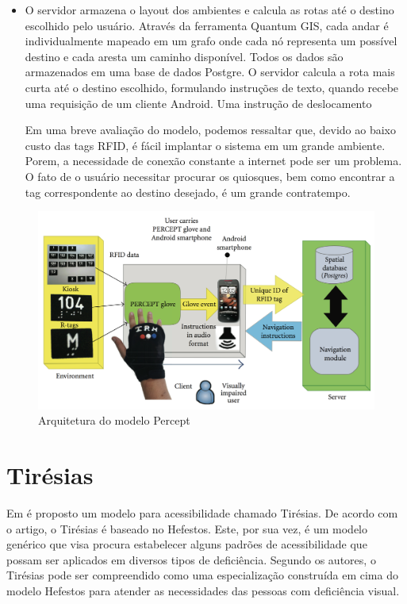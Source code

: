 \documentclass[english,brazilian]{UNISINOSmonografia}
\begin{document}
\begin{itemize}
	\item O servidor armazena o layout dos ambientes e calcula as rotas até o destino escolhido pelo usuário. Através da ferramenta Quantum GIS, cada andar é individualmente mapeado em um grafo onde cada nó representa um possível destino e cada aresta um caminho disponível. Todos os dados são armazenados em uma base de dados Postgre. O servidor calcula a rota mais curta até o destino escolhido, formulando instruções de texto, quando recebe uma requisição de um cliente Android. Uma instrução de deslocamento 

	Em uma breve avaliação do modelo, podemos ressaltar que, devido ao baixo custo das tags RFID, é fácil implantar o sistema em um grande ambiente. Porem, a necessidade de conexão constante a internet pode ser um problema. O fato de o usuário necessitar procurar os quiosques, bem como encontrar a tag correspondente ao destino desejado, é um grande contratempo.
\end{itemize}

	\FloatBarrier
	\begin{figure}[!ht]
		\caption{Arquitetura do modelo Percept}
		\label{fig:visaoGeral}
		\centering%
		\begin{minipage}{.9\textwidth}
			\includegraphics[width=\textwidth]{imgs/perceptArquitetura}
		\end{minipage}
	\end{figure}
	\FloatBarrier

	\section{Tirésias}
Em  é proposto um modelo para acessibilidade chamado Tirésias. De acordo com o artigo, o Tirésias é baseado no Hefestos. Este, por sua vez, é um modelo genérico que visa procura estabelecer alguns padrões de acessibilidade que possam ser aplicados em diversos tipos de deficiência. Segundo os autores, o Tirésias pode ser compreendido como uma especialização construída em cima do modelo Hefestos para atender as necessidades das pessoas com deficiência visual. 
\end{document}
